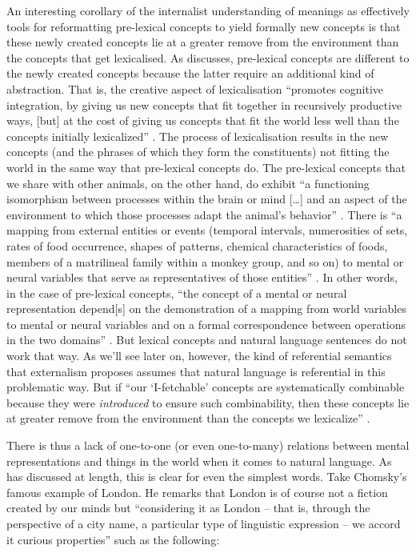 An interesting corollary of the internalist understanding of meanings as effectively tools for reformatting pre-lexical concepts to yield formally new concepts is that these newly created concepts lie at a greater remove from the environment than the concepts that get lexicalised. As \citet{Pietroski2010} discusses, pre-lexical concepts are different to the newly created concepts because the latter require an additional kind of abstraction. That is, the creative aspect of lexicalisation “promotes cognitive integration, by giving us new concepts that fit together in recursively productive ways, [but] at the cost of giving us concepts that fit the world less well than the concepts initially lexicalized” \citep[250]{Pietroski2010}. The process of lexicalisation results in the new concepts (and the phrases of which they form the constituents) not fitting the world in the same way that pre-lexical concepts do. The pre-lexical concepts that we share with other animals, on the other hand, do exhibit “a functioning isomorphism between processes within the brain or mind […] and an aspect of the environment to which those processes adapt the animal’s behavior” \citep[1--2]{Gallistel1990}. There is “a mapping from external entities or events (temporal intervals, numerosities of sets, rates of food occurrence, shapes of patterns, chemical characteristics of foods, members of a matrilineal family within a monkey group, and so on) to mental or neural variables that serve as representatives of those entities” \citep[2]{Gallistel1990}. In other words, in the case of pre-lexical concepts, “the concept of a mental or neural representation depend[s] on the demonstration of a mapping from world variables to mental or neural variables and on a formal correspondence between operations in the two domains” \citep[4]{Gallistel1990}. But lexical concepts and natural language sentences do not work that way. As we’ll see later on, however, the kind of referential semantics that externalism proposes assumes that natural language is referential in this problematic way. But if “our ‘I-fetchable’ concepts are systematically combinable because they were \textit{introduced} to ensure such combinability, then these concepts lie at greater remove from the environment than the concepts we lexicalize” \citep[266, emphasis in original]{Pietroski2010}.
	
There is thus a lack of one-to-one (or even one-to-many) relations between mental representations and things in the world when it comes to natural language. As \citet{Chomsky2000,Chomsky2003a,Chomsky2003b,Chomsky2016} has discussed at length, this is clear for even the simplest words. Take Chomsky’s famous example of London. He remarks that London is of course not a fiction created by our minds but “considering it as London – that is, through the perspective of a city name, a particular type of linguistic expression – we accord it curious properties” such as the following:

